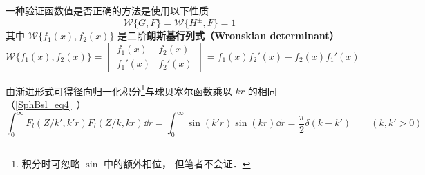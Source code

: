 一种验证函数值是否正确的方法是使用以下性质
\begin{equation}
\mathcal{W}\{G, F\} = \mathcal{W}\{H^\pm, F\} = 1
\end{equation}
其中 $\mathcal{W}\{f_1(x), f_2(x)\}$ 是二阶\textbf{朗斯基行列式（Wronskian determinant）}
\begin{equation}
\mathcal{W}\{f_1(x), f_2(x)\} = \begin{vmatrix}
f_1(x)  & f_2(x) \\
f_1'(x) & f_2'(x)
\end{vmatrix} = f_1(x) f_2'(x) - f_2(x) f_1'(x)
\end{equation}


由渐进形式可得径向归一化积分\footnote{积分时可忽略 $\sin$ 中的额外相位， 但笔者不会证．}与球贝塞尔函数乘以 $kr$ 的相同（\autoref{SphBsl_eq4}~）
\begin{equation}
\int_0^\infty F_l(Z/k', k' r)F_l(Z/k, kr) \dd{r} = \int_0^\infty \sin(k'r)\sin(kr) \dd{r} = \frac{\pi}{2}\delta(k - k') \qquad (k, k' > 0)
\end{equation}
